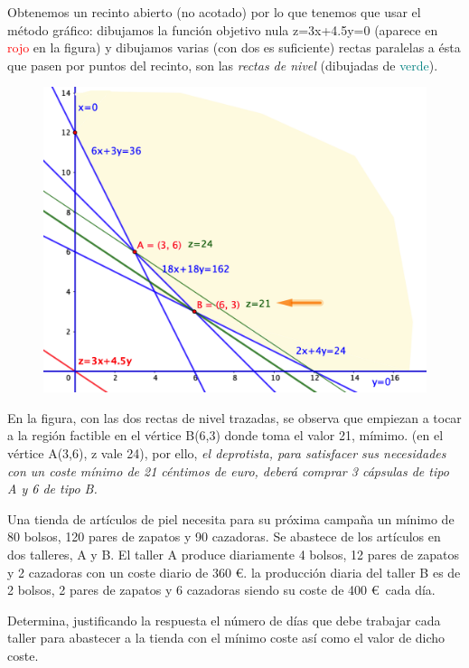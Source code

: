 \vspace{3mm} Obtenemos un recinto abierto (no acotado) por lo que tenemos que usar el método gráfico: dibujamos la función objetivo nula z=3x+4.5y=0 (aparece en \textcolor{red}{rojo} en la figura) y dibujamos varias (con dos es suficiente) rectas paralelas a ésta que pasen por puntos del recinto, son las \emph{rectas de nivel} (dibujadas de \textcolor{teal}{verde}).

\vspace{5mm}
\begin{figure}[H]
	\centering
	\includegraphics[width=.75\textwidth]{imagenes/img43.png}
\end{figure}

\vspace{5mm} En la figura, con las dos rectas de nivel trazadas, se observa que empiezan a tocar a la región factible en el vértice B(6,3) donde toma el valor 21, mímimo. (en el vértice A(3,6), z vale 24), por ello, \emph{el deprotista, para satisfacer sus necesidades con un coste mínimo de 21 céntimos de euro, deberá comprar 3 cápsulas de tipo A y 6 de tipo B.}



\vspace{10mm}
\begin{ejemplo}
\begin{ejer}
	Una tienda de artículos de piel necesita para su próxima campaña un mínimo de 80 bolsos, 120 pares de zapatos y 90 cazadoras. Se abastece de los artículos en dos talleres, A y B. El taller A produce diariamente 4 bolsos, 12 pares de zapatos y 2 cazadoras con un coste diario de 360 \euro. la producción diaria del taller B es de 2 bolsos, 2 pares de zapatos y 6 cazadoras siendo su coste de 400 \euro $\,$ cada día.
	
	Determina, justificando la respuesta el número de días que debe trabajar cada taller para abastecer a la tienda con el mínimo coste así como el valor de dicho coste.

\end{ejer}	
\end{ejemplo}
\vspace{5mm}

